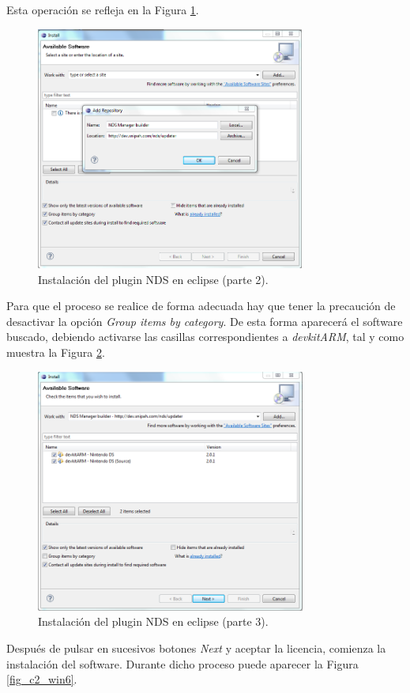 Esta operación se refleja en la Figura \ref{fig_c2_win2}.

\begin{figure}[t]
\centering
\includegraphics[height=8cm]{./Figuras/C2/c2_instalar_windows2.png}
\caption{Instalación del plugin NDS en eclipse (parte 2).}
\label{fig_c2_win2}
\end{figure}

Para que el proceso se realice de forma adecuada hay que tener la precaución de desactivar la opción \textit{Group items by category}. De esta forma aparecerá el software buscado, debiendo activarse las casillas correspondientes a \textit{devkitARM}, tal y como muestra la Figura \ref{fig_c2_win4}.

\begin{figure}[t]
\centering
\includegraphics[height=8cm]{./Figuras/C2/c2_instalar_windows4.png}
\caption{Instalación del plugin NDS en eclipse (parte 3).}
\label{fig_c2_win4}
\end{figure}

Después de pulsar en sucesivos botones \textit{Next} y aceptar la licencia, comienza la instalación  del software. Durante dicho proceso puede aparecer la Figura \ref{fig_c2_win6}.

